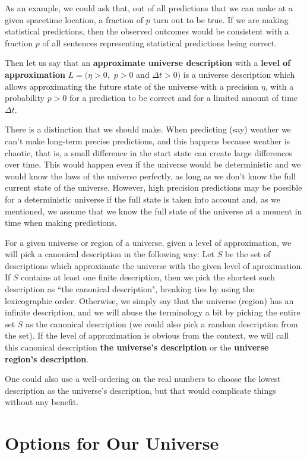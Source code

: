 \documentclass[a4paper
,draft
]{article}
\newcommand{\definitie}[1]{\textbf{#1}}
\newcommand{\ghilimele}[1]{``#1"}
\begin{document}
As an example, we could ask that, out of all predictions that we can make
at a given spacetime location, a fraction of $p$ turn out to be true.
If we are making
statistical predictions, then the observed outcomes would be consistent
with a fraction $p$ of all sentences representing statistical predictions
being correct.

Then let us say that an \definitie{approximate universe description} with a
\definitie{level of approximation} $L=(\eta>0,$ $p>0$ and $\Delta t>0)$
is a universe description which allows approximating the future
state of the universe with a precision $\eta$, with a probability
$p>0$ for a prediction to be correct
and for a limited amount of time $\Delta t$.

There is a distinction that we should make.
When predicting (say) weather we can't make long-term precise predictions,
and this happens because weather is chaotic, that is, a small difference
in the start state can create large differences over time.
This would happen even if the universe would be deterministic
and we would know the laws of the universe perfectly, as long as we don't know
the full current state of the universe.
However, high precision predictions may be possible for a deterministic
universe if the full state
is taken into account and, as we mentioned, we assume that we know the full
state of the universe at a moment in time when making predictions.

For a given universe or region of a universe,
given a level of approximation, we will pick a canonical description
in the following way: Let $S$ be the set of descriptions which approximate
the universe with the given level of aproximation. If $S$ contains
at least one finite description, then we pick the shortest such
description as \ghilimele{the canonical description}, breaking ties by
using the lexicographic order. Otherwise, we simply say that the
universe (region) has an infinite description, and we will abuse the
terminology a bit by picking the entire set
$S$ as the canonical description (we could
also pick a random description from the set).
If the level of approximation is obvious from the context, we will call
this canonical description \definitie{the universe's description}
or the \definitie{universe region's description}.

One could also use a well-ordering on the real numbers to choose the
lowest description as the universe's description, but that would
complicate things without any benefit.

\section{Options for Our Universe}
\label{sec:options}
\end{document}
